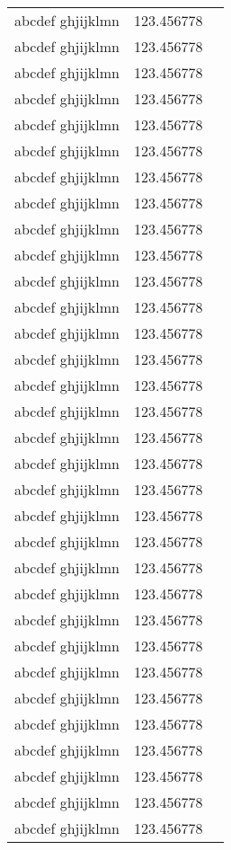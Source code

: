 \begin{longtable}{|l|l|l|}
  abcdef ghjijklmn & 123.456778 \\
  abcdef ghjijklmn & 123.456778 \\
  abcdef ghjijklmn & 123.456778 \\
  abcdef ghjijklmn & 123.456778 \\
  abcdef ghjijklmn & 123.456778 \\
  abcdef ghjijklmn & 123.456778 \\
  abcdef ghjijklmn & 123.456778 \\
  abcdef ghjijklmn & 123.456778 \\
  abcdef ghjijklmn & 123.456778 \\
  abcdef ghjijklmn & 123.456778 \\
  abcdef ghjijklmn & 123.456778 \\
  abcdef ghjijklmn & 123.456778 \\
  abcdef ghjijklmn & 123.456778 \\
  abcdef ghjijklmn & 123.456778 \\
  abcdef ghjijklmn & 123.456778 \\
  abcdef ghjijklmn & 123.456778 \\
  abcdef ghjijklmn & 123.456778 \\
  abcdef ghjijklmn & 123.456778 \\
  abcdef ghjijklmn & 123.456778 \\
  abcdef ghjijklmn & 123.456778 \\
  abcdef ghjijklmn & 123.456778 \\
  abcdef ghjijklmn & 123.456778 \\
  abcdef ghjijklmn & 123.456778 \\
  abcdef ghjijklmn & 123.456778 \\
  abcdef ghjijklmn & 123.456778 \\
  abcdef ghjijklmn & 123.456778 \\
  abcdef ghjijklmn & 123.456778 \\
  abcdef ghjijklmn & 123.456778 \\
  abcdef ghjijklmn & 123.456778 \\
  abcdef ghjijklmn & 123.456778 \\
  abcdef ghjijklmn & 123.456778 \\
  abcdef ghjijklmn & 123.456778 \\
\end{longtable}
